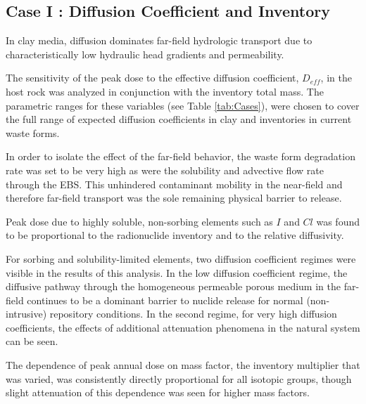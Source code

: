 
\subsection{Case I : Diffusion Coefficient and Inventory }
\label{sec:diffusivity}

In clay media, diffusion dominates far-field hydrologic transport due to 
characteristically low hydraulic head gradients and permeability. 

The sensitivity of the peak dose to the effective diffusion coefficient, 
$D_{eff}$, in the host rock was analyzed in conjunction with the inventory 
total mass. The parametric ranges for these variables (see Table 
\ref{tab:Cases}), were chosen to cover the full range of expected diffusion 
coefficients in clay and inventories in current waste forms.

In order to isolate the effect of the far-field behavior, the waste form 
degradation rate was set to be very high as were the solubility and advective 
flow rate through the  \gls{EBS}. This unhindered contaminant mobility in the 
near-field and therefore far-field transport was the sole remaining physical 
barrier to release.

Peak dose due to highly soluble, non-sorbing elements such as $I$ and $Cl$ 
was found to be proportional to the radionuclide inventory and 
to the relative diffusivity. 

For sorbing and solubility-limited elements,
two diffusion coefficient regimes were visible in the results of this analysis. 
In the low diffusion coefficient regime, the diffusive pathway through the 
homogeneous permeable porous medium in the far-field continues to be a  dominant 
barrier to nuclide release for normal (non-intrusive) repository conditions.  
In the second regime, for very high diffusion coefficients, the effects of 
additional attenuation phenomena in the natural system can be seen. 

The dependence of peak annual dose on mass factor, the inventory multiplier that 
was varied, was consistently directly 
proportional for all isotopic groups, though slight attenuation of this 
dependence was seen for higher mass factors.
